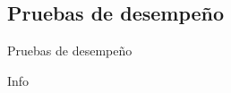 %
%
%

\subsection{Pruebas de desempeño}

\begin{frame}{Pruebas de desempeño}
  
  Info


\end{frame}
